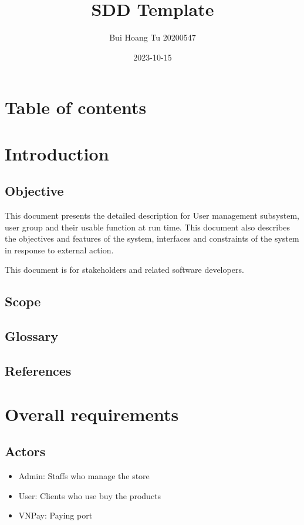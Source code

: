 \documentclass[letterpaper]{report}
\title{SDD Template}
\author{Bui Hoang Tu 20200547}
\date{2023-10-15}
\begin{document}

\clearpage\clearpage
\chapter{Table of contents}

\bigskip

\setcounter{tocdepth}{3}
\tableofcontents

\bigskip

\chapter{Introduction}
\section{Objective}
This document presents the detailed description for User management subsystem, user group and their usable function at run time. This document also describes the objectives and features of the system, interfaces and constraints of the system in response to external action.

This document is for stakeholders and related software developers.

\section{Scope}

\bigskip

\section{Glossary}
\section{References}
\chapter{Overall requirements}
\section{Actors}
\begin{itemize}
\item Admin: Staffs who manage the store
\item User: Clients who use buy the products
\item VNPay: Paying port 
\end{itemize}
\end{document}
